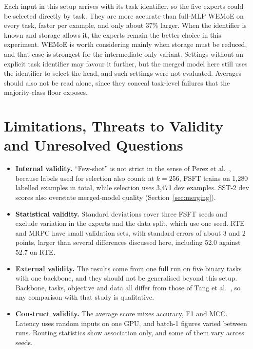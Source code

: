 Each input in this setup arrives with its task identifier, so the five experts could be selected directly by task. They are more accurate than full-MLP WEMoE on every task, faster per example, and only about 37\% larger. When the identifier is known and storage allows it, the experts remain the better choice in this experiment. WEMoE is worth considering mainly when storage must be reduced, and that case is strongest for the intermediate-only variant. Settings without an explicit task identifier may favour it further, but the merged model here still uses the identifier to select the head, and such settings were not evaluated. Averages should also not be read alone, since they conceal task-level failures that the majority-class floor exposes.

\section{Limitations, Threats to Validity and Unresolved Questions}

\begin{itemize}
  \item \textbf{Internal validity.} ``Few-shot'' is not strict in the sense of Perez et al.~\cite{perez2021truefewshot}, because labels used for selection also count: at $k=256$, FSFT trains on 1,280 labelled examples in total, while selection uses 3,471 dev examples. SST-2 dev scores also overstate merged-model quality (Section~\ref{sec:merging}).
  \item \textbf{Statistical validity.} Standard deviations cover three FSFT seeds and exclude variation in the experts and the data split, which use one seed. RTE and MRPC have small validation sets, with standard errors of about 3 and 2 points, larger than several differences discussed here, including 52.0 against 52.7 on RTE.
  \item \textbf{External validity.} The results come from one full run on five binary tasks with one backbone, and they should not be generalised beyond this setup. Backbone, tasks, objective and data all differ from those of Tang et al.~\cite{tang2024wemoe}, so any comparison with that study is qualitative.
  \item \textbf{Construct validity.} The average score mixes accuracy, F1 and MCC. Latency uses random inputs on one GPU, and batch-1 figures varied between runs. Routing statistics show association only, and some of them vary across seeds.
\end{itemize}


